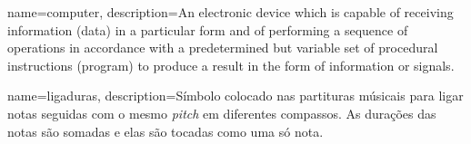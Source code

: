  {
	name={computer}, 
	description={An electronic device which is capable of receiving information (data) in a particular form and of performing a sequence of operations in accordance with a predetermined but variable set of procedural instructions (program) to produce a result in the form of information or signals.}
}

 {
	name={ligaduras}, 
	description={Símbolo colocado nas partituras músicais para ligar notas seguidas com o mesmo \textit{pitch} em diferentes compassos. As durações das notas são somadas e elas são tocadas como uma só nota.}
}

\glsaddall
